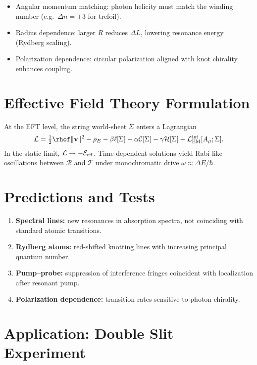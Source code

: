 \documentclass[11pt,a4paper]{article}
\begin{document}
        \begin{itemize}
        \item Angular momentum matching: photon helicity must match the winding number (e.g.\ $\Delta n=\pm 3$ for trefoil).
        \item Radius dependence: larger $R$ reduces $\Delta L$, lowering resonance energy (Rydberg scaling).
        \item Polarization dependence: circular polarization aligned with knot chirality enhances coupling.
        \end{itemize}

\section{Effective Field Theory Formulation}

    At the EFT level, the string world-sheet $\Sigma$ enters a Lagrangian
    \begin{equation}
    \mathcal L = \tfrac12 \rhof \|\mathbf v\|^2 - \rho_E
    - \beta \ell[\Sigma] - \alpha \mathcal C[\Sigma]
    - \gamma \mathcal H[\Sigma] + \mathcal L_{\rm EM}^{\rm int}[A_\mu;\Sigma].
    \end{equation}
    In the static limit, $\mathcal L \to -\mathcal E_{\rm eff}$.
    Time-dependent solutions yield Rabi-like oscillations between $\mathcal R$ and $\mathcal T$
    under monochromatic drive $\omega\approx \Delta E/\hbar$.

\section{Predictions and Tests}

    \begin{enumerate}
    \item \textbf{Spectral lines:} new resonances in absorption spectra, not coinciding with standard atomic transitions.
    \item \textbf{Rydberg atoms:} red-shifted knotting lines with increasing principal quantum number.
    \item \textbf{Pump--probe:} suppression of interference fringes coincident with localization after resonant pump.
    \item \textbf{Polarization dependence:} transition rates sensitive to photon chirality.
    \end{enumerate}

\section{Application: Double Slit Experiment}
\end{document}

